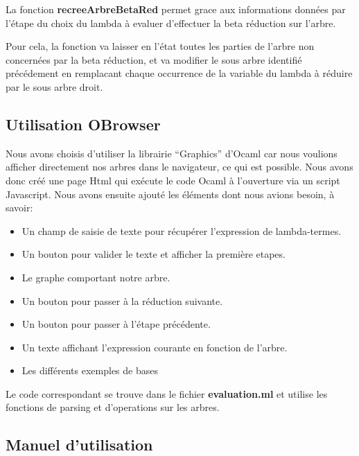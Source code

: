 \documentclass[a4paper,11pt,titlepage]{article}
\begin{document}
  La fonction \textbf{recreeArbreBetaRed} permet grace aux informations données par l'étape du choix du lambda à evaluer d'effectuer la
beta réduction sur l'arbre.

  Pour cela, la fonction va laisser en l'état toutes les parties de l'arbre non concernées par la beta réduction, et va modifier
le sous arbre identifié précédement en remplacant chaque occurrence de la variable du lambda à réduire par le sous arbre
droit.


\subsection{Utilisation OBrowser}

  Nous avons choisis d'utiliser la librairie ``Graphics'' d'Ocaml car nous voulions afficher directement nos arbres dans le navigateur, ce qui est possible. Nous avons donc créé une page Html qui exécute le code Ocaml à l'ouverture via un script Javascript. Nous avons ensuite ajouté les éléments dont nous avions besoin, à savoir:
\begin{itemize}
 \item Un champ de saisie de texte pour récupérer l'expression de lambda-termes.
 \item Un bouton pour valider le texte et afficher la première etapes.
 \item Le graphe comportant notre arbre.
 \item Un bouton pour passer à la réduction suivante.
 \item Un bouton pour passer à l'étape précédente.
 \item Un texte affichant l'expression courante en fonction de l'arbre.
 \item Les différents exemples de bases\\
\end{itemize}

  Le code correspondant se trouve dans le fichier \textbf{evaluation.ml} et utilise les fonctions de parsing et d'operations sur les arbres.


\subsection{Manuel d'utilisation}
\end{document}
